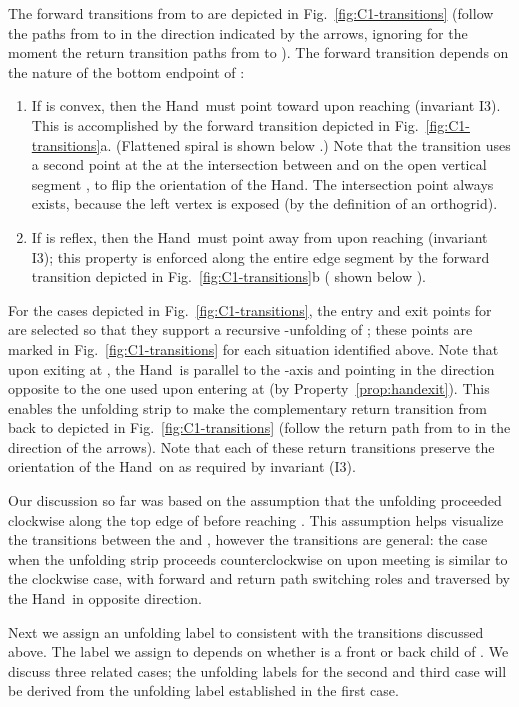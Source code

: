 \documentclass[11pt]{article}
\newcommand\hand{{\sc Hand}}
\begin{document}
The forward transitions from  to  are depicted in Fig.~\ref{fig:C1-transitions} (follow the paths from  to  in the direction indicated by the arrows, ignoring for the moment the return transition paths from  to ). The forward transition depends on the nature of the bottom endpoint  of :
\begin{enumerate}
\item If  is convex, then  the \hand\ must point toward  upon reaching  (invariant I3). This is accomplished by the forward transition depicted in Fig.~\ref{fig:C1-transitions}a. (Flattened spiral  is shown below .) Note that the transition uses a second point  at the at the intersection between  and  on the open vertical segment , to flip the orientation of the \hand. The intersection point  always exists, because the left vertex  is exposed (by the definition of an orthogrid). 
\item If  is reflex, then the \hand\ must point away from  upon reaching  (invariant I3); this property is enforced along the entire edge segment  by the forward transition depicted in Fig.~\ref{fig:C1-transitions}b ( shown below ).
\end{enumerate}
For the cases depicted in Fig.~\ref{fig:C1-transitions}, 
the entry and exit points for  are selected so that they support a recursive -unfolding of ; these points are marked in Fig.~\ref{fig:C1-transitions} for each situation identified above. Note that upon exiting  at ,  the \hand\ is parallel to the -axis and pointing in the direction opposite to the one used upon entering  at  (by Property~\ref{prop:handexit}). This enables the unfolding strip to make the complementary return transition from  back to  depicted in Fig.~\ref{fig:C1-transitions} (follow the return path from  to  in the direction of the arrows). Note that each of these return transitions preserve the orientation of the \hand\  on  as required by invariant (I3). 

Our discussion so far was based on the assumption that the unfolding proceeded clockwise along the top edge of  before reaching . This assumption helps visualize the transitions between the  and , however the transitions are general: the case when the unfolding strip proceeds counterclockwise on  upon meeting  is similar to the clockwise case, with forward and return path switching roles and traversed by the \hand\ in opposite direction. 

Next we assign an unfolding label to  consistent with the transitions discussed above. The label we assign to  depends 
on whether  is a front or back child of . 
We discuss three related cases; the unfolding labels for the second and third case will be derived from the unfolding label established in the first case.
\end{document}

